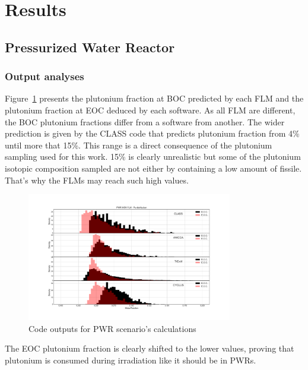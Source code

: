 
\section{Results}
 
\subsection{Pressurized Water Reactor}

\subsubsection{Output analyses}
Figure~\ref{fig:PWR_MOX_FLM_Pu} presents the plutonium fraction at BOC predicted by each FLM and the plutonium fraction at EOC deduced by each software. As all FLM are different, the BOC plutonium fractions differ from a software from another. The wider prediction is given by the CLASS code that predicts plutonium fraction from 4\% until more that 15\%. This range is a direct consequence of the plutonium sampling used for this work. 15\% is clearly unrealistic but some of the plutonium isotopic composition sampled are not either by containing a low amount of fissile. That's why the FLMs may reach such high values.   

\begin{figure}[h]
	\begin{center}
		\includegraphics[width = 0.8\textwidth]{../../Feature_1/RAW_DATA/FIG/PWR_MOX_FLM_Pu.pdf}
		\caption{Code outputs for PWR scenario's calculations}
		\label{fig:PWR_MOX_FLM_Pu}
	\end{center}
\end{figure}

The EOC plutonium fraction is clearly shifted to the lower values, proving that plutonium is consumed during irradiation like it should be in PWRs.   

